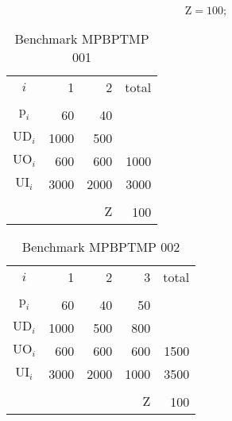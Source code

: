 \documentclass[authoryear,preprint,12pt]{elsarticle}
\begin{document}
\begin{equation}
\textrm{Z} = 100;
\end{equation}


\begin{table}[h]
\begin{center}
\begin{tabular}[c]{c r r r}
$i$ & 1 & 2 & total \\
\cline {1-4} \\
$\textrm{p}_i$ & 60 & 40 & \\
$\textrm{UD}_i$ & 1000 & 500 & \\
$\textrm{UO}_i$ & 600 & 600 & 1000 \\
$\textrm{UI}_i$ & 3000 & 2000 & 3000 \\
\cline {1-4} \\
& & $\textrm{Z}$ & 100 \\
\end{tabular}
\caption{Benchmark MPBPTMP 001}
\label{tab:MBPTMP001}
\end{center}
\end{table}

\begin{table}[h]
\begin{center}
\begin{tabular}[c]{c r r r r}
$i$ & 1 & 2 & 3 & total \\
\cline {1-5} \\
$\textrm{p}_i$ & 60 & 40 & 50 \\
$\textrm{UD}_i$ & 1000 & 500 & 800 \\
$\textrm{UO}_i$ & 600 & 600 & 600 & 1500 \\
$\textrm{UI}_i$ & 3000 & 2000 & 1000 & 3500 \\
\cline {1-5} \\
& & & $\textrm{Z}$ & 100 \\
\end{tabular}
\caption{Benchmark MPBPTMP 002}
\label{tab:MBPTMP002}
\end{center}
\end{table}
\end{document}
